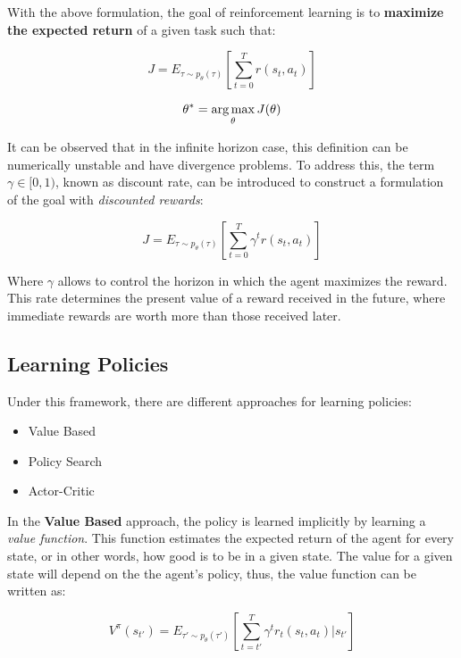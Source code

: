 With the above formulation, the goal of reinforcement learning is to \textbf{maximize the expected return} of a given task such that:

\begin{equation}
    J = E_{\tau \sim p_{\theta}(\tau)} \left[\sum_{t=0}^{T}r(s_{t}, a_{t})\right]
\end{equation}

\begin{equation}
    \theta^{*} = \operatorname*{arg\,max}_{\theta}J(\theta)
\label{eq:objective}
\end{equation}

It can be observed that in the infinite horizon case, this definition can be numerically unstable and have divergence problems. To address this, the term $\gamma \in [0, 1)$, known as discount rate, can be introduced to construct a formulation of the goal with \emph{discounted rewards}:

\begin{equation}
    J = E_{\tau \sim p_{\theta}(\tau)} \left[\sum_{t=0}^{T}\gamma^{t}r(s_{t}, a_{t})\right]
\end{equation}

Where $\gamma$ allows to control the horizon in which the agent maximizes the reward. This rate determines the present value of a reward received in the future, where immediate rewards are worth more than those received later.

\subsection{Learning Policies}

Under this framework, there are different approaches for learning policies:

\begin{itemize}
    \item Value Based
    \item Policy Search
    \item Actor-Critic
\end{itemize}

In the \textbf{Value Based} approach, the policy is learned implicitly by learning a \emph{value function}. This function estimates the expected return of the agent for every state, or in other words, how good is to be in a given state. The value for a given state will depend on the the agent's policy, thus, the value function can be written as:

\begin{equation}
    V^{\pi}(s_{t'})  = E_{\tau' \sim p_{\theta}(\tau')}\left[\sum_{t=t'}^{T}\gamma^{t}r_{t}(s_{t}, a_{t})|s_{t'}\right]
\end{equation}

